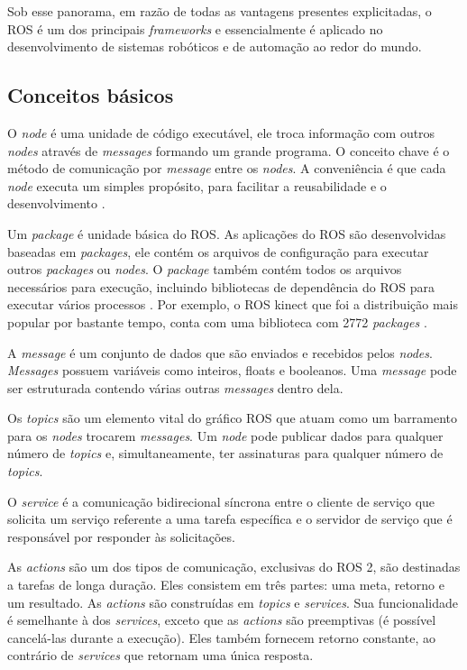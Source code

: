 Sob esse panorama, em razão de todas as vantagens presentes explicitadas, o ROS é um dos principais \textit{frameworks} e essencialmente é aplicado no desenvolvimento de sistemas robóticos e de automação ao redor do mundo.


\subsection{Conceitos básicos}

O \textit{node} é uma unidade de código executável, ele troca informação com outros \textit{nodes} através de \textit{messages} formando um grande programa. O conceito chave é o método de comunicação por \textit{message} entre os \textit{nodes}. A conveniência é que cada \textit{node} executa um simples propósito, para facilitar a reusabilidade e o desenvolvimento \cite{ROS_book_En}.

Um \textit{package} é unidade básica do ROS. As aplicações do ROS são desenvolvidas baseadas em \textit{packages}, ele contém os arquivos de configuração para executar outros \textit{packages} ou \textit{nodes}. O \textit{package} também contém todos os arquivos necessários para execução, incluindo bibliotecas de dependência do ROS para executar vários processos \cite{ROS_book_En}. Por exemplo, o ROS kinect que foi a distribuição mais popular por bastante tempo, conta com uma biblioteca com 2772 \textit{packages} \cite{ROSindex}.

A \textit{message} é um conjunto de dados que são enviados e recebidos pelos \textit{nodes}. \textit{Messages} possuem variáveis como inteiros, floats e booleanos. Uma \textit{message} pode ser estruturada contendo várias outras \textit{messages} dentro dela.

Os \textit{topics} são um elemento vital do gráfico ROS que atuam como um barramento para os \textit{nodes} trocarem \textit{messages}. Um \textit{node} pode publicar dados para qualquer número de \textit{topics} e, simultaneamente, ter assinaturas para qualquer número de \textit{topics}.

O \textit{service} é a comunicação bidirecional síncrona entre o cliente de serviço que solicita um serviço referente a uma tarefa específica e o servidor de serviço que é responsável por responder às solicitações.

As \textit{actions} são um dos tipos de comunicação, exclusivas do ROS 2, são destinadas a tarefas de longa duração. Eles consistem em três partes: uma meta, retorno e um resultado. As \textit{actions} são construídas em \textit{topics} e \textit{services}. Sua funcionalidade é semelhante à dos \textit{services}, exceto que as \textit{actions} são preemptivas (é possível cancelá-las durante a execução). Eles também fornecem retorno constante, ao contrário de \textit{services} que retornam uma única resposta.

